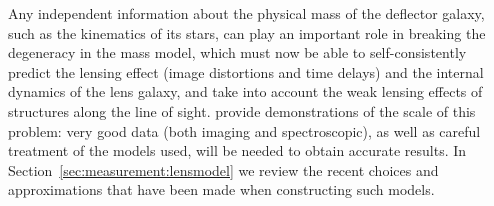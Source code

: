 Any independent information about  the physical mass of the deflector
galaxy, such as the kinematics of its stars, can play an important role
in breaking the degeneracy in the mass model, which must now be able to
self-consistently predict the lensing effect (image distortions and time
delays) and the internal dynamics of the lens galaxy, and take into
account the weak lensing effects of structures along the line of sight.
\citet{S+S13} provide demonstrations of the scale of this problem: very
good data (both imaging and spectroscopic), as well as careful treatment
of the models used, will be needed to obtain accurate results.  In
Section~\ref{sec:measurement:lensmodel} we review the recent choices and
approximations that have been made when constructing such models.


